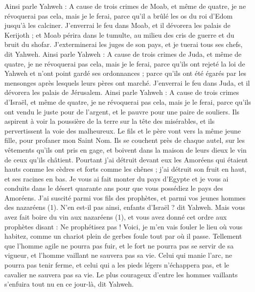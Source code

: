 \begin{multicols}{2}
\VerseOne{}Ainsi parle Yahweh : A cause de trois crimes de Moab, et même de quatre, je ne révoquerai pas cela, mais je le ferai, parce qu'il a brûlé les os du roi d'Edom jusqu’à les calciner.
J'enverrai le feu dans Moab, et il dévorera les palais de Kerijoth ; et Moab périra dans le tumulte, au milieu des cris de guerre et du bruit du shofar.
J'exterminerai les juges de son pays, et je tuerai tous ses chefs, dit Yahweh.
Ainsi parle Yahweh : A cause de trois crimes de Juda, et même de quatre, je ne révoquerai pas cela, mais je le ferai, parce qu'ils ont rejeté la loi de Yahweh et n'ont point gardé ses ordonnances ; parce qu’ils ont été égarés par les mensonges après lesquels leurs pères ont marché.
J'enverrai le feu dans Juda, et il dévorera les palais de Jérusalem.
Ainsi parle Yahweh : A cause de trois crimes d'Israël, et même de quatre, je ne révoquerai pas cela, mais je le ferai, parce qu'ils ont vendu le juste pour de l'argent, et le pauvre pour une paire de souliers.
Ils aspirent à voir la poussière de la terre sur la tête des misérables, et ils pervertissent la voie des malheureux. Le fils et le père vont vers la même jeune fille, pour profaner mon Saint Nom.
Ils se couchent près de chaque autel, sur les vêtements qu'ils ont pris en gage, et boivent dans la maison de leurs dieux le vin de ceux qu’ils châtient.
Pourtant j'ai détruit devant eux les Amoréens qui étaient hauts comme les cèdres et forts comme les chênes ; j'ai détruit son fruit en haut, et ses racines en bas.
Je vous ai fait monter du pays d'Egypte et je vous ai conduits dans le désert quarante ans pour que vous possédiez le pays des Amoréens.
J'ai suscité parmi vos fils des prophètes, et parmi vos jeunes hommes des nazaréens (1). N'en est-il pas ainsi, enfants d'Israël ? dit Yahweh.
Mais vous avez fait boire du vin aux nazaréens (1), et vous avez donné cet ordre aux prophètes disant : Ne prophétisez pas !
Voici, je m’en vais fouler le lieu où vous habitez, comme un chariot plein de gerbes foule tout par où il passe.
Tellement que l’homme agile ne pourra pas fuir, et le fort ne pourra pas se servir de sa vigueur, et l’homme vaillant ne sauvera pas sa vie.
Celui qui manie l'arc, ne pourra pas tenir ferme, et celui qui a les pieds légers n'échappera pas, et le cavalier ne sauvera pas sa vie.
Le plus courageux d’entre les hommes vaillants s'enfuira tout nu en ce jour-là, dit Yahweh.

\end{multicols}
